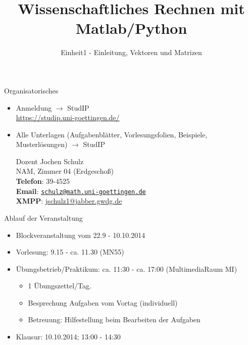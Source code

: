 \documentclass[hyperref={xetex}]{beamer}
\title{Wissenschaftliches Rechnen mit Matlab/Python}
\subtitle{Einheit1 - Einleitung, Vektoren und Matrizen}
\begin{document}
\titlepage


\begin{frame}{Organisatorisches}
\begin{itemize}
\item Anmeldung $\rightarrow$ StudIP \\
      \url{https://studip.uni-goettingen.de/}

{\color{blue}{Wissenschaftliches Rechnen mit Matlab/Python (Mathematische Anwendersysteme)}}
\item Alle Unterlagen (Aufgabenblätter, Vorlesungsfolien, Beispiele, Musterlösungen) $\rightarrow$ StudIP
\pause
\begin{block}{Dozent}
Jochen Schulz\\
NAM, Zimmer 04 (Erdgescho{\ss})\\
\textbf{Telefon}: 39-4525\\
\textbf{Email}: \href{mailto:schulz@math.uni-goettingen.de}{\texttt{schulz@math.uni-goettingen.de}}\\
\textbf{XMPP}: \url{jschulz1@jabber.gwdg.de}\\

\end{block}
\end{itemize}
\end{frame}


\begin{frame}{Ablauf der Veranstaltung}
\begin{itemize}
\item Blockveranstaltung vom  22.9 - 10.10.2014
\item \alert{Vorlesung:} 9.15 - ca. 11.30  (MN55)
\item \alert{Übungsbetrieb/Praktikum}: ca. 11:30 - ca. 17:00  (MultimediaRaum MI)
\begin{itemize}
\item 1 Übungszettel/Tag.
\item Besprechung Aufgaben vom Vortag (individuell)
\item Betreuung: Hilfestellung beim Bearbeiten der Aufgaben
\end{itemize}
\item \alert{Klausur:} 10.10.2014; 13:00 - 14:30
\end{itemize}

\end{frame}
\end{document}
